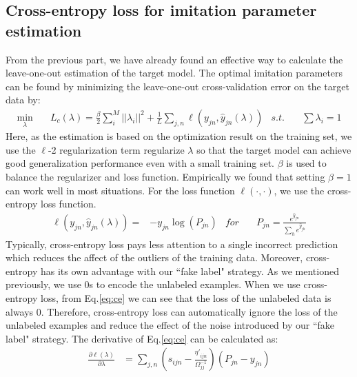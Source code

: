 \subsection{Cross-entropy loss for imitation parameter estimation}
From the previous part, we have already found an effective way to calculate the leave-one-out estimation of the target model. The optimal imitation parameters can be found by minimizing the leave-one-out cross-validation error on the target data by:
\begin{equation}\label{eq:loo_loss}
\begin{aligned}
\underset{\lambda}{\min} \quad& L_c\left(\lambda\right)=\frac{\beta}{2}\sum_i^M||\lambda_i||^2+\frac{1}{L}\sum_{j,n}\ell\left(y_{jn},\hat{y}_{jn}\left(\lambda\right)\right) &
s.t. \quad& \sum\lambda_i=1
\end{aligned}
\end{equation}
Here, as the estimation is based on the optimization result on the training set,  we use the $\ell$-2 regularization term regularize $\lambda$ so that the target model can achieve good generalization performance even with a small training set. $\beta$ is used to balance the regularizer and loss function. Empirically we found that setting $\beta=1$ can work well in most situations. For the loss function $\ell(\cdot,\cdot)$, we use the cross-entropy loss function.
\begin{equation}\label{eq:ce}
\begin{aligned}
\ell\left(y_{jn},\hat{y}_{jn}\left(\lambda\right)\right)=&-y_{jn}\log(P_{jn}) & for \quad&
P_{jn} = \frac{e^{\hat{y}_{jn}}}{\sum_{h} e^{\hat{y}_{jh}}}
\end{aligned}
\end{equation}
Typically, cross-entropy loss pays less attention to a single incorrect prediction which reduces the affect of the outliers of the training data. Moreover, cross-entropy has its own advantage with our ``fake label" strategy. As we mentioned previously, we use 0s to encode the unlabeled examples. When we use cross-entropy loss, from Eq.\eqref{eq:ce} we can see that the loss of the unlabeled data is always 0. Therefore, cross-entropy loss can automatically ignore the loss of the unlabeled examples and reduce the effect of the noise introduced by our ``fake label" strategy. 
The derivative of Eq.\eqref{eq:ce} can be calculated as:
\begin{equation}\label{eq:p}
\begin{aligned}
\frac{\partial \ell(\lambda)}{\partial \lambda}&=\sum_{j,n}\left(s_{ijn}-\frac{{\eta'}_{ijn}}{\Omega_{jj}^{-1}}\right)\left(P_{jn}-{y}_{jn}\right)
\end{aligned}
\end{equation}
